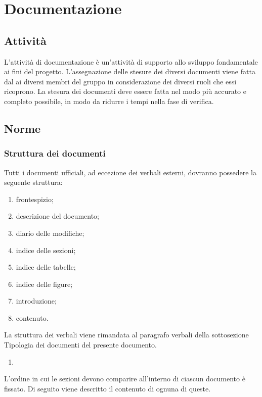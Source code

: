 \section{Documentazione}
	\subsection{Attività}
	L'attività di documentazione è un'attività di supporto allo sviluppo fondamentale ai fini del progetto.
	L'assegnazione delle stesure dei diversi documenti viene fatta dal  ai diversi membri del gruppo in considerazione dei diversi ruoli che essi ricoprono.
	La stesura dei documenti deve essere fatta nel modo più accurato e completo possibile, in modo da ridurre i tempi nella fase di verifica.
	\subsection{Norme}
		\subsubsection{Struttura dei documenti}
			Tutti i documenti ufficiali, ad eccezione dei verbali esterni, dovranno possedere la seguente struttura:
			\begin{enumerate}
				\item frontespizio;
				\item descrizione del documento;
				\item diario delle modifiche;
				\item indice delle sezioni;
				\item indice delle tabelle;
				\item indice delle figure;
				\item introduzione;
				\item contenuto.
			\end{enumerate}
			La struttura dei verbali viene rimandata al paragrafo verbali della sottosezione Tipologia dei documenti del presente documento.
			\begin{enumerate}
			\item 
			\end{enumerate}
			L’ordine in cui le sezioni devono comparire all’interno di ciascun documento è fissato. Di seguito viene descritto il contenuto di ognuna di queste.
